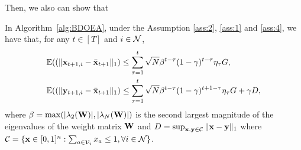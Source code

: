Then, we also can show that
	\begin{lemma}\label{lemma::3}
		In Algorithm~\ref{alg:BDOEA}, under the Assumption \ref{ass:2}, \ref{ass:1}  and \ref{ass:4}, we have that, for any $t\in[T]$ and $i\in\mathcal{N}$, 
		\begin{equation*}
			\begin{aligned}
				&\mathbb{E}((\|\mathbf{x}_{t+1,i}-\bar{\mathbf{x}}_{t+1}\|_{1})\le \sum_{\tau=1}^{t}\sqrt{N}\beta^{t-\tau}(1-\gamma)^{t-\tau}\eta_{\tau}G,\\
				&\mathbb{E}((\|\mathbf{y}_{t+1,i}-\bar{\mathbf{x}}_{t+1}\|_{1})\le \sum_{\tau=1}^{t}\sqrt{N}\beta^{t-\tau}(1-\gamma)^{t+1-\tau}\eta_{\tau}G+\gamma D,
			\end{aligned}
		\end{equation*} where $\beta=\max(|\lambda_{2}(\mathbf{W})|,|\lambda_{N}(\mathbf{W})|)$ is the second largest magnitude of the eigenvalues of the weight matrix $\mathbf{W}$ and $D=\sup_{\mathbf{x},\mathbf{y}\in\mathcal{C}}\|\mathbf{x}-\mathbf{y}\|_{1}$ where $\mathcal{C}=\{\mathbf{x}\in[0,1]^{n}: \sum_{a\in\mathcal{V}_{i}}x_{a}\le1,\forall i\in\mathcal{N}\}$.
	\end{lemma}
